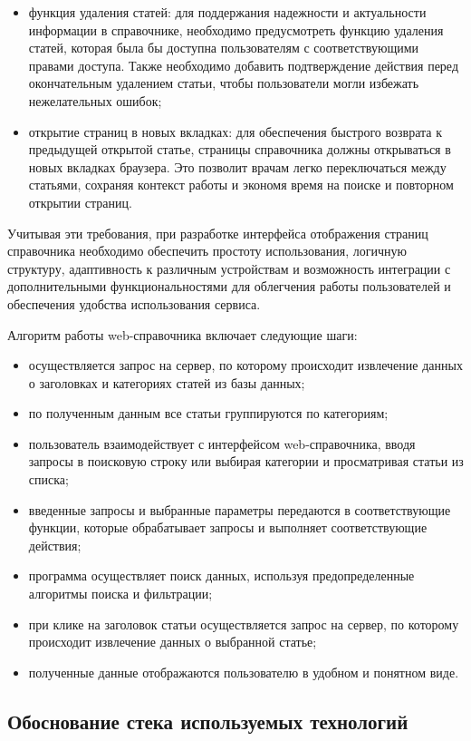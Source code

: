 \begin{itemize}
    \item функция удаления статей: для поддержания надежности и актуальности информации в справочнике, необходимо предусмотреть функцию удаления статей, которая была бы доступна пользователям с соответствующими правами доступа. Также необходимо добавить подтверждение действия перед окончательным удалением статьи, чтобы пользователи могли избежать нежелательных ошибок;
    \item открытие страниц в новых вкладках: для обеспечения быстрого возврата к предыдущей открытой статье, страницы справочника должны открываться в новых вкладках браузера. Это позволит врачам легко переключаться между статьями, сохраняя контекст работы и экономя время на поиске и повторном открытии страниц.
\end{itemize}

Учитывая эти требования, при разработке интерфейса отображения страниц справочника необходимо обеспечить простоту использования, логичную структуру, адаптивность к различным устройствам и возможность интеграции с дополнительными функциональностями для облегчения работы пользователей и обеспечения удобства использования сервиса.

Алгоритм работы web-справочника включает следующие шаги:

\begin{itemize}
    \item осуществляется запрос на сервер, по которому происходит извлечение данных о заголовках и категориях статей из базы данных;
    \item по полученным данным все статьи группируются по категориям;   
    \item пользователь взаимодействует с интерфейсом web-справочника, вводя запросы в поисковую строку или выбирая категории и просматривая статьи из списка;
    \item введенные запросы и выбранные параметры передаются в соответствующие функции, которые обрабатывает запросы и выполняет соответствующие действия;
    \item программа осуществляет поиск данных, используя предопределенные алгоритмы поиска и фильтрации;
    \item при клике на заголовок статьи осуществляется запрос на сервер, по которому происходит извлечение данных о выбранной статье;
    \item полученные данные отображаются пользователю в удобном и понятном виде.
\end{itemize}

\subsection{Обоснование стека используемых технологий}

